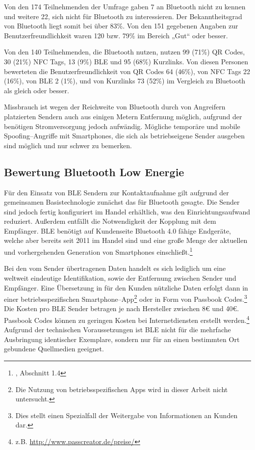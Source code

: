 Von den 174 Teilnehmenden der Umfrage gaben 7 an Bluetooth nicht zu kennen und weitere 22, sich nicht für Bluetooth zu interessieren. Der Bekanntheitsgrad von Bluetooth liegt somit bei über 83\%. Von den 151 gegebenen Angaben zur Benutzerfreundlichkeit waren 120 bzw. 79\% im Bereich „Gut“ oder besser.

Von den 140 Teilnehmenden, die Bluetooth nutzen, nutzen 99 (71\%) QR Codes, 30 (21\%) NFC Tags, 13 (9\%) \ac{BLE} und 95 (68\%) Kurzlinks. Von diesen Personen bewerteten die  Benutzerfreundlichkeit von QR Codes 64 (46\%), von NFC Tags 22 (16\%), von \ac{BLE} 2 (1\%), und von Kurzlinks 73 (52\%) im Vergleich zu Bluetooth als gleich oder besser.

Missbrauch ist wegen der Reichweite von Bluetooth durch von Angreifern platzierten Sendern auch aus einigen Metern Entfernung möglich, aufgrund der benötigen Stromversorgung jedoch aufwändig. Mögliche temporäre und mobile Spoofing–Angriffe mit Smartphones, die sich als betriebseigene Sender ausgeben sind möglich und nur schwer zu bemerken. 


\subsection{Bewertung Bluetooth Low Energie} %
\label{sub:bewertung_bluetooth_low_energie}
Für den Einsatz von \ac{BLE} Sendern zur Kontaktaufnahme gilt aufgrund der gemeinsamen Basistechnologie zunächst das für Bluetooth gesagte. Die Sender sind jedoch fertig konfiguriert im Handel erhältlich, was den Einrichtungsaufwand reduziert. Außerdem entfällt die Notwendigkeit der Kopplung mit dem Empfänger. \ac{BLE} benötigt auf Kundenseite Bluetooth 4.0 fähige Endgeräte, welche aber bereits seit 2011 im Handel sind und eine große Menge der aktuellen und vorhergehenden Generation von Smartphones einschließt.\footnote{\cite{gilchrist}, Abschnitt 1.4}

Bei den vom Sender übertragenen Daten handelt es sich lediglich um eine weltweit eindeutige Identifikation, sowie der Entfernung zwischen Sender und Empfänger. Eine Übersetzung in für den Kunden nützliche Daten erfolgt dann in einer betriebsspezifischen Smartphone–App\footnote{Die Nutzung von betriebsspezifischen Apps wird in dieser Arbeit nicht untersucht.} oder in Form von Passbook Codes.\footnote{Dies stellt einen Spezialfall der Weitergabe von Informationen an Kunden dar.} Die Kosten pro BLE Sender betragen je nach Hersteller zwischen 8€ und 40€. Passbook Codes können zu geringen Kosten bei Internetdiensten erstellt werden.\footnote{z.B. \url{http://www.passcreator.de/preise/}} Aufgrund der technischen Voraussetzungen ist \ac{BLE} nicht für die mehrfache Ausbringung identischer Exemplare, sondern nur für an einen bestimmten Ort gebundene Quellmedien geeignet. 

